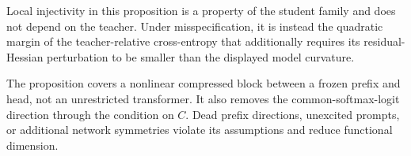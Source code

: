 Local injectivity in this proposition is a property of the student family and
does not depend on the teacher.  Under misspecification, it is instead the
quadratic margin of the teacher-relative cross-entropy that additionally
requires its residual-Hessian perturbation to be smaller than the displayed
model curvature.

The proposition covers a nonlinear compressed block between a frozen prefix and head, not an unrestricted transformer. It also removes the common-softmax-logit direction through the condition on \(C\). Dead prefix directions, unexcited prompts, or additional network symmetries violate its assumptions and reduce functional dimension.
